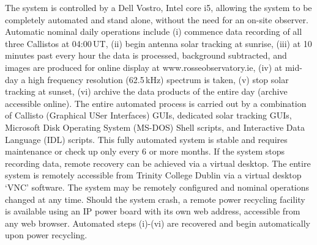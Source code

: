 The system is controlled by a Dell Vostro, Intel core i5, allowing the system to be completely automated and stand alone, without the need for an on-site observer. Automatic nominal daily operations include (i) commence data recording of all three Callistos at 04:00\,UT, (ii) begin antenna solar tracking at sunrise, (iii) at 10 minutes past every hour the data is processed, background subtracted, and images are produced for online display at www.rosseobservatory.ie, (iv) at mid-day a high frequency resolution (62.5\,kHz) spectrum is taken, (v) stop solar tracking at sunset, (vi) archive the data products of the entire day (archive accessible online). The entire automated process is carried out by a combination of Callisto (Graphical USer Interfaces) GUIs, dedicated solar tracking GUIs, Microsoft Disk Operating System (MS-DOS) Shell scripts, and Interactive Data Language (IDL) scripts. This fully automated system is stable and requires maintenance or check up only every 6 or more months. If the system stops recording data, remote recovery can be achieved via a virtual desktop. The entire system is remotely accessible from Trinity College Dublin via a virtual desktop `VNC' software. The system may be remotely configured and nominal operations changed at any time. Should the system crash, a remote power recycling facility is available using an IP power board with its own web address, accessible from any web browser. Automated steps (i)-(vi) are recovered and begin automatically upon power recycling.

